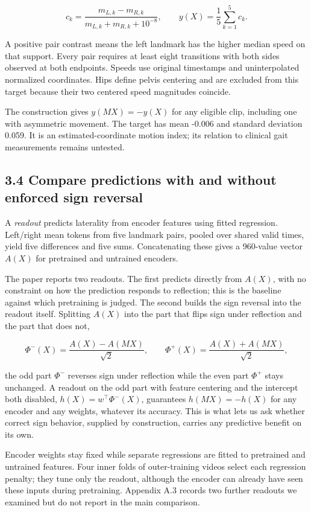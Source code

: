 \documentclass{article}
\begin{document}
\[
c_k=\frac{m_{L,k}-m_{R,k}}{m_{L,k}+m_{R,k}+10^{-8}},
\qquad y(X)=\frac{1}{5}\sum_{k=1}^{5}c_k.
\]

A positive pair contrast means the left landmark has the higher median
speed on that support. Every pair requires at least eight transitions
with both sides observed at both endpoints. Speeds use original
timestamps and uninterpolated normalized coordinates. Hips define pelvis
centering and are excluded from this target because their two centered
speed magnitudes coincide.

The construction gives \(y(MX)=-y(X)\) for any eligible clip, including
one with asymmetric movement. The target has mean -0.006 and standard
deviation 0.059. It is an estimated-coordinate motion index; its
relation to clinical gait measurements remains untested.

\subsection{3.4 Compare predictions with and without enforced sign
reversal}\label{compare-predictions-with-and-without-enforced-sign-reversal}

A \emph{readout} predicts laterality from encoder features using fitted
regression. Left/right mean tokens from five landmark pairs, pooled over
shared valid times, yield five differences and five sums. Concatenating
these gives a 960-value vector \(A(X)\) for pretrained and untrained
encoders.

The paper reports two readouts. The first predicts directly from
\(A(X)\), with no constraint on how the prediction responds to
reflection; this is the baseline against which pretraining is judged.
The second builds the sign reversal into the readout itself. Splitting
\(A(X)\) into the part that flips sign under reflection and the part
that does not,

\[
\Phi^-(X)=\frac{A(X)-A(MX)}{\sqrt{2}},
\qquad
\Phi^+(X)=\frac{A(X)+A(MX)}{\sqrt{2}},
\]

the odd part \(\Phi^-\) reverses sign under reflection while the even
part \(\Phi^+\) stays unchanged. A readout on the odd part with feature
centering and the intercept both disabled, \(h(X)=w^\top\Phi^-(X)\),
guarantees \(h(MX)=-h(X)\) for any encoder and any weights, whatever its
accuracy. This is what lets us ask whether correct sign behavior,
supplied by construction, carries any predictive benefit on its own.

Encoder weights stay fixed while separate regressions are fitted to
pretrained and untrained features. Four inner folds of outer-training
videos select each regression penalty; they tune only the readout,
although the encoder can already have seen these inputs during
pretraining. Appendix A.3 records two further readouts we examined but
do not report in the main comparison.
\end{document}

